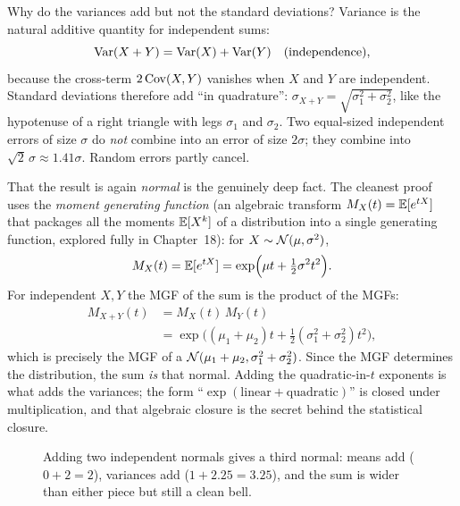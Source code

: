 \begin{whybox}
Why do the variances add but not the standard deviations? Variance is the natural
additive quantity for independent sums:
\[
  \operatorname{Var}(X+Y) = \operatorname{Var}(X) + \operatorname{Var}(Y) \quad (\text{independence}),
\]
because the cross-term $2\operatorname{Cov}(X,Y)$ vanishes when $X$ and $Y$ are independent.
Standard deviations therefore add ``in quadrature'':
$\sigma_{X+Y} = \sqrt{\sigma_1^2 + \sigma_2^2}$, like the hypotenuse of a right
triangle with legs $\sigma_1$ and $\sigma_2$. Two equal-sized independent
errors of size $\sigma$ do \emph{not} combine into an error of size $2\sigma$;
they combine into $\sqrt{2}\,\sigma \approx 1.41\sigma$. Random errors partly
cancel.

That the result is again \emph{normal} is the genuinely deep fact. The cleanest
proof uses the \emph{moment generating function} (an algebraic transform
$M_X(t) = \operatorname{\mathbb{E}}[e^{tX}]$ that packages all the moments $\operatorname{\mathbb{E}}[X^k]$ of a distribution
into a single generating function, explored fully in Chapter~18): for
$X\sim\mathcal{N}(\mu,\sigma^2)$,
\[
  M_X(t) = \operatorname{\mathbb{E}}[e^{tX}] = \exp\!\Big(\mu t + \tfrac{1}{2}\sigma^2 t^2\Big).
\]
For independent $X,Y$ the MGF of the sum is the product of the MGFs:
\begin{align*}
  M_{X+Y}(t) &= M_X(t)\,M_Y(t) \\
             &= \exp\!\Big((\mu_1+\mu_2)t + \tfrac{1}{2}(\sigma_1^2+\sigma_2^2)t^2\Big),
\end{align*}
which is precisely the MGF of a $\mathcal{N}(\mu_1+\mu_2,\sigma_1^2+\sigma_2^2)$. Since
the MGF determines the distribution, the sum \emph{is} that normal. Adding the
quadratic-in-$t$ exponents is what adds the variances; the form
``$\exp(\text{linear} + \text{quadratic})$'' is closed under multiplication, and
that algebraic closure is the secret behind the statistical closure.
\end{whybox}

\begin{figure}[H]
\centering
{}
\caption{Adding two independent normals gives a third normal: means add
($0+2=2$), variances add ($1 + 2.25 = 3.25$), and the sum is wider than either
piece but still a clean bell.}
\label{ch12:fig-sum}
\end{figure}

